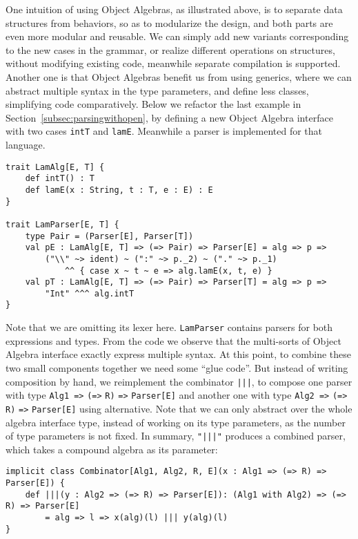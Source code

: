 One intuition of using Object Algebras, as illustrated above, is to separate data structures from behaviors, so as to modularize the design, and both parts are even more modular and reusable. We can simply add new variants corresponding to the new cases in the grammar, or realize different operations on structures, without modifying existing code, meanwhile separate compilation is supported. Another one is that Object Algebras benefit us from using generics, where we can abstract multiple syntax in the type parameters, and define less classes, simplifying code comparatively. Below we refactor the last example in Section~\ref{subsec:parsingwithopen}, by defining a new Object Algebra interface with two cases \lstinline{intT} and \lstinline{lamE}. Meanwhile a parser is implemented for that language.
\begin{lstlisting}
trait LamAlg[E, T] {
    def intT() : T
    def lamE(x : String, t : T, e : E) : E
}

trait LamParser[E, T] {
    type Pair = (Parser[E], Parser[T])
    val pE : LamAlg[E, T] => (=> Pair) => Parser[E] = alg => p =>
        ("\\" ~> ident) ~ (":" ~> p._2) ~ ("." ~> p._1)
            ^^ { case x ~ t ~ e => alg.lamE(x, t, e) }
    val pT : LamAlg[E, T] => (=> Pair) => Parser[T] = alg => p =>
        "Int" ^^^ alg.intT
}
\end{lstlisting}
Note that we are omitting its lexer here. \lstinline{LamParser} contains parsers for both expressions and types. From the code we observe that the multi-sorts of Object Algebra interface
exactly express multiple syntax. At this point, to combine these two small components together we need some ``glue code''. But instead of writing composition by hand, we reimplement the combinator \lstinline{|||}, to compose one parser with type \lstinline{Alg1 =>} \lstinline{(=>} \lstinline{R)} \lstinline{=>} \lstinline{Parser[E]} and another one with type \lstinline{Alg2 =>} \lstinline{(=>} \lstinline{R)} \lstinline{=>} \lstinline{Parser[E]} using alternative. Note that we can only abstract over the whole algebra interface type, instead of working on its type parameters, as the number of type parameters is not fixed. In summary, \lstinline{"|||"} produces a combined parser, which takes a compound algebra as its parameter:
\begin{lstlisting}
implicit class Combinator[Alg1, Alg2, R, E](x : Alg1 => (=> R) => Parser[E]) {
    def |||(y : Alg2 => (=> R) => Parser[E]): (Alg1 with Alg2) => (=> R) => Parser[E]
        = alg => l => x(alg)(l) ||| y(alg)(l)
}
\end{lstlisting}
